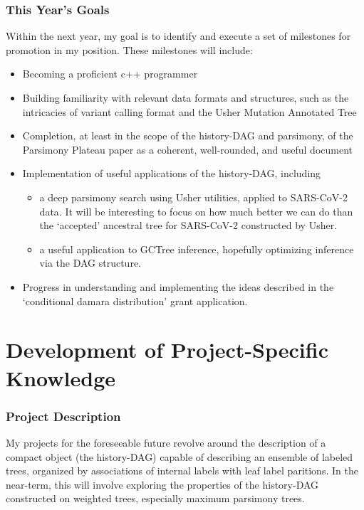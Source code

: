 \documentclass{paper}
\begin{document}
\subsubsection*{This Year's Goals}
Within the next year, my goal is to identify and execute a set of milestones for promotion in my position. These milestones will include:
\begin{itemize}
    \item Becoming a proficient c++ programmer
    \item Building familiarity with relevant data formats and structures, such as the intricacies of variant calling format and the Usher Mutation Annotated Tree
    \item Completion, at least in the scope of the history-DAG and parsimony, of the Parsimony Plateau paper as a coherent, well-rounded, and useful document
    \item Implementation of useful applications of the history-DAG, including
        \begin{itemize}
            \item a deep parsimony search using Usher utilities, applied to SARS-CoV-2 data.
                It will be interesting to focus on how much better we can do than the `accepted' ancestral tree for SARS-CoV-2 constructed by Usher.
            \item a useful application to GCTree inference, hopefully optimizing inference via the DAG structure.
        \end{itemize}
    \item Progress in understanding and implementing the ideas described in the `conditional damara distribution' grant application.
\end{itemize}

\section*{Development of Project-Specific Knowledge}
\subsubsection*{Project Description}
My projects for the foreseeable future revolve around the description of a compact object (the history-DAG) capable of describing an ensemble of labeled trees, organized by associations of internal labels with leaf label paritions.
In the near-term, this will involve exploring the properties of the history-DAG constructed on weighted trees, especially maximum parsimony trees.
\end{document}
